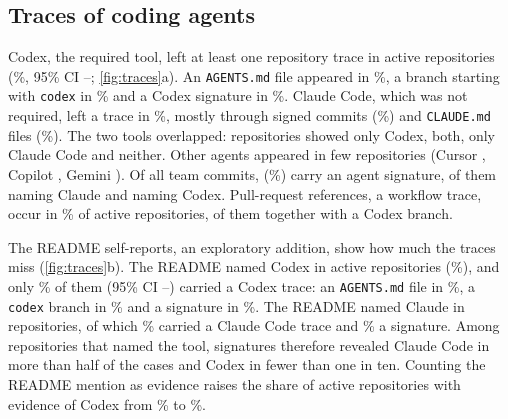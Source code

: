 \documentclass{article}
\begin{document}
\subsection{Traces of coding agents}\label{sec:traces}

Codex, the required tool, left at least one repository trace in \NRqTwoTracesCodexAnyN{} active repositories (\NRqTwoTracesCodexAnyPct\%, 95\% CI \NRqTwoTracesCodexAnyLo--\NRqTwoTracesCodexAnyHi; \cref{fig:traces}a). An \texttt{AGENTS.md} file appeared in \NRqTwoTracesCodexFilePct\%, a branch starting with \texttt{codex} in \NRqTwoTracesCodexBranchPct\% and a Codex signature in \NRqTwoTracesCodexSignaturePct\%. Claude Code, which was not required, left a trace in \NRqTwoTracesClaudeAnyPct\%, mostly through signed commits (\NRqTwoTracesClaudeSignaturePct\%) and \texttt{CLAUDE.md} files (\NRqTwoTracesClaudeFilePct\%). The two tools overlapped: \NRqTwoTracesCodexNotClaudeN{} repositories showed only Codex, \NRqTwoTracesCodexAndClaudeN{} both, \NRqTwoTracesClaudeNotCodexN{} only Claude Code and \NRqTwoTracesNeitherCodexNorClaudeN{} neither. Other agents appeared in few repositories (Cursor \NRqTwoTracesCursorAnyN, Copilot \NRqTwoTracesCopilotAnyN, Gemini \NRqTwoTracesGeminiAnyN). Of all team commits, \NRqTwoTracesSignedCommitsN{} (\NRqTwoTracesSignedCommitsPct\%) carry an agent signature, \NRqTwoTracesSignedCommitsByKindClaude{} of them naming Claude and \NRqTwoTracesSignedCommitsByKindCodex{} naming Codex. Pull-request references, a workflow trace, occur in \NRqTwoTracesPrRefsPct\% of active repositories, \NRqTwoTracesPrRefsWithCodexBranch{} of them together with a Codex branch.

The README self-reports, an exploratory addition, show how much the traces miss (\cref{fig:traces}b). The README named Codex in \NRqTwoTracesSelfReportCodexMentionN{} active repositories (\NRqTwoTracesSelfReportCodexMentionPct\%), and only \NRqTwoTracesSelfReportCodexTraceGivenMentionPct\% of them (95\% CI \NRqTwoTracesSelfReportCodexTraceGivenMentionLo--\NRqTwoTracesSelfReportCodexTraceGivenMentionHi) carried a Codex trace: an \texttt{AGENTS.md} file in \NRqTwoTracesSelfReportCodexFileGivenMentionPct\%, a \texttt{codex} branch in \NRqTwoTracesSelfReportCodexBranchGivenMentionPct\% and a signature in \NRqTwoTracesSelfReportCodexSignatureGivenMentionPct\%. The README named Claude in \NRqTwoTracesSelfReportClaudeMentionN{} repositories, of which \NRqTwoTracesSelfReportClaudeTraceGivenMentionPct\% carried a Claude Code trace and \NRqTwoTracesSelfReportClaudeSignatureGivenMentionPct\% a signature. Among repositories that named the tool, signatures therefore revealed Claude Code in more than half of the cases and Codex in fewer than one in ten. Counting the README mention as evidence raises the share of active repositories with evidence of Codex from \NRqTwoTracesCodexAnyPct\% to \NRqTwoTracesSelfReportCodexTraceOrMentionPct\%.
\end{document}
